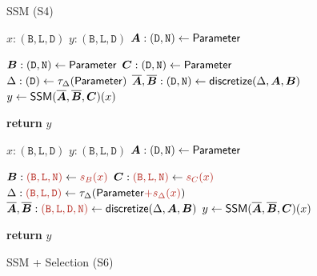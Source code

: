 \begin{figure}[!t]
  \begin{minipage}{.49\linewidth}
    \begin{algorithm}[H]
      \small
      \algrenewcommand{}
      \algrenewcommand{}
      \caption{SSM (S4)}
      \label{alg:s4}
      \begin{algorithmic}[1]
        \Require $x : \mathtt{(B, L, D)}$
        \Ensure $y : \mathtt{(B, L, D)}$
        \State $\bm{A} : \mathtt{(D, N)} \gets \mathsf{Parameter}$

        \State $\bm{B} : \mathtt{(D, N)} \gets \mathsf{Parameter}$
        \State $\bm{C} : \mathtt{(D, N)} \gets \mathsf{Parameter}$
        \State $\Delta : \mathtt{(D)} \gets \tau_\Delta(\mathsf{Parameter})$
        \State $\overline{\bm{A}}, \overline{\bm{B}} : \mathtt{(D, N)} \gets \mathsf{discretize}(\Delta, \bm{A}, \bm{B})$
        \State $y \gets \mathsf{SSM}(\overline{\bm{A}}, \overline{\bm{B}}, \bm{C})(x)$

        \State \textbf{return} $y$
      \end{algorithmic}
    \end{algorithm}
  \end{minipage}
  \begin{minipage}{.49\linewidth}
    \begin{algorithm}[H]
      \small
      \algrenewcommand{}
      \algrenewcommand{}
      \caption{SSM + Selection (S6)}
      \label{alg:s6}
      \begin{algorithmic}[1]
        \Require $x : \mathtt{(B, L, D)}$
        \Ensure $y : \mathtt{(B, L, D)}$
        \State $\bm{A} : \mathtt{(D, N)} \gets \mathsf{Parameter}$

        \State $\B : \textcolor{BrickRed}{\mathtt{(B, L, N)}} \gets \textcolor{BrickRed}{s_B(x)}$
        \State $\C : \textcolor{BrickRed}{\mathtt{(B, L, N)}} \gets \textcolor{BrickRed}{s_C(x)}$
        \State $\dt : \textcolor{BrickRed}{\mathtt{(B, L, D)}} \gets \tau_\dt(\mathsf{Parameter} \textcolor{BrickRed}{+ s_\dt(x)})$
        \State $\dA, \dB : \textcolor{BrickRed}{\mathtt{(B, L, D, N)}} \gets \mathsf{discretize}(\dt, \A, \B)$
        \State $y \gets \mathsf{SSM}(\overline{\bm{A}}, \overline{\bm{B}}, \bm{C})(x)$

        \State \textbf{return} $y$
      \end{algorithmic}
    \end{algorithm}
  \end{minipage}
  \iftoggle{arxiv}{}{\vspace{-1em}}
\end{figure}


